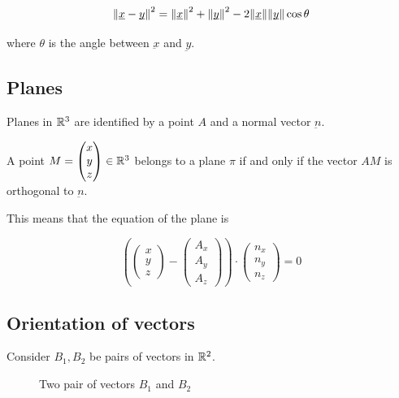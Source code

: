 \documentclass[10pt]{extarticle}
\renewcommand{\vec}[1]{\underbar{\ensuremath{#1}}}
\begin{document}
$$
    \norm{\vec{x} - \vec{y}}^2 = \norm{\vec{x}}^2 + \norm{\vec{y}}^2 - 2 \norm{\vec{x}} \norm{\vec{y}} \cos \theta
$$

where $\theta$ is the angle between $\vec{x}$ and $\vec{y}$.

\subsection{Planes}

Planes in $\mathbb{R}^3$ are identified by a point $A$ and a normal vector $\vec{n}$.

A point $M = \begin{pmatrix}
        x \\ y \\ z
    \end{pmatrix} \in \mathbb{R}^3$ belongs to a plane $\pi$ if and only if the vector $AM$ is orthogonal to $\vec{n}$.

This means that the equation of the plane is

$$
    \left(
    \begin{pmatrix}
            x \\ y \\ z
        \end{pmatrix} - \begin{pmatrix}
            A_x \\ A_y \\ A_z
        \end{pmatrix}
    \right)
    \cdot
    \begin{pmatrix}
        n_x \\ n_y \\ n_z
    \end{pmatrix}
    = 0
$$

\subsection{Orientation of vectors}

Consider $B_1, B_2$ be pairs of vectors in $\mathbb{R}^2$.

\begin{figure}[H]
    \centering

    \caption{Two pair of vectors $B_1$ and $B_2$}
    \label{fig:orientation_of_vectors}
\end{figure}
\end{document}
